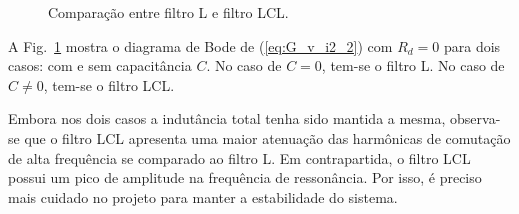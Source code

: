 
    \begin{figure}[htb]
        \caption{Comparação entre filtro L e filtro LCL.}
        \label{fig:L_vs_LCL}
    \end{figure}

    A Fig.~\ref{fig:L_vs_LCL} mostra o diagrama de Bode de (\ref{eq:G_v_i2_2})
    com $R_d = 0$ para dois casos: com e sem capacitância $C$. No caso de $C = 0$,
    tem-se o filtro L. No caso de $C \neq 0$, tem-se o filtro LCL.

    Embora nos dois casos a indutância total tenha sido mantida a mesma, observa-se
    que o filtro LCL apresenta uma maior atenuação das harmônicas de comutação
    de alta frequência se comparado ao filtro L. Em contrapartida, o filtro LCL
    possui um pico de amplitude na frequência de ressonância. Por isso, é preciso
    mais cuidado no projeto para manter a estabilidade do sistema.

